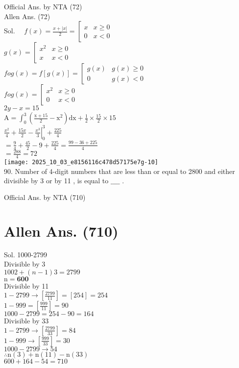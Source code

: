 \documentclass[10pt]{article}
\begin{document}
Official Ans. by NTA (72)\\
Allen Ans. (72)\\
Sol. \(\quad f(x)=\frac{x+|x|}{2}=\left[\begin{array}{ll}x & x \geq 0 \\ 0 & x<0\end{array}\right.\)\\
\(g(x)=\left[\begin{array}{cc}x^{2} & x \geq 0 \\ x & x<0\end{array}\right.\)\\
\(f o g(x)=f[g(x)]=\left[\begin{array}{cc}g(x) & g(x) \geq 0 \\ 0 & g(x)<0\end{array}\right.\)\\
\(f o g(x)=\left[\begin{array}{cc}x^{2} & x \geq 0 \\ 0 & x<0\end{array}\right.\)\\
\(2 y-x=15\)\\
\(\mathrm{A}=\int_{0}^{3}\left(\frac{\mathrm{x}+15}{2}-\mathrm{x}^{2}\right) \mathrm{dx}+\frac{1}{2} \times \frac{15}{2} \times 15\)\\
\(\frac{x^{2}}{4}+\frac{15 x}{2}-\left.\frac{x^{3}}{3}\right|_{0} ^{3}+\frac{225}{4}\)\\
\(=\frac{9}{4}+\frac{45}{2}-9+\frac{225}{4}=\frac{99-36+225}{4}\)\\
\(=\frac{288}{4}=72\)\\
\texttt{[image: 2025\_10\_03\_e8156116c478d57175e7g-10]}\\
90. Number of 4-digit numbers that are less than or equal to 2800 and either divisible by 3 or by 11 , is equal to \(\_\_\_\_\) .

Official Ans. by NTA (710)

\section*{Allen Ans. (710)}
Sol. 1000-2799\\
Divisible by 3\\
\(1002+(n-1) 3=2799\)\\
\(\mathrm{n}=\mathbf{6 0 0}\)\\
Divisible by 11\\
\(1-2799 \rightarrow\left[\frac{2799}{11}\right]=[254]=254\)\\
\(1-999=\left[\frac{999}{11}\right]=90\)\\
\(1000-2799=254-90=164\)\\
Divisible by 33\\
\(1-2799 \rightarrow\left[\frac{2799}{33}\right]=84\)\\
\(1-999 \rightarrow\left[\frac{999}{33}\right]=30\)\\
\(1000-2799 \rightarrow 54\)\\
\(\therefore \mathrm{n}(3)+\mathrm{n}(11)-\mathrm{n}(33)\)\\
\(600+164-54=710\)
\end{document}
